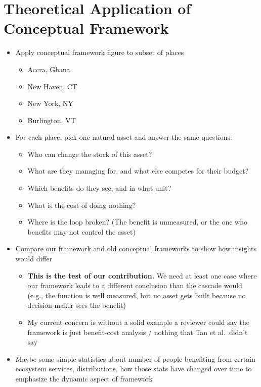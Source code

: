\documentclass[12pt]{article}
\begin{document}
\section{Theoretical Application of Conceptual Framework}\label{sec:app}
\begin{itemize}
  \item Apply conceptual framework figure to subset of places 
  \begin{itemize}
    \item Accra, Ghana
    \item New Haven, CT
    \item New York, NY
    \item Burlington, VT
  \end{itemize}
  \item For each place, pick one natural asset and answer the same questions:
  \begin{itemize}
    \item Who can change the stock of this asset?
    \item What are they managing for, and what else competes for their budget?
    \item Which benefits do they see, and in what unit?
    \item What is the cost of doing nothing?
    \item Where is the loop broken? (The benefit is unmeasured, or the one who benefits may not control the asset)
  \end{itemize}
  \item Compare our framework and old conceptual frameworks to show how insights would differ 
  \begin{itemize}
    \item \textbf{This is the test of our contribution.} We need at least one case where our framework leads to a different conclusion than the cascade would (e.g., the function is well measured, but no asset gets built because no decision-maker sees the benefit)
    \item My current concern is without a solid example a reviewer could say the framework is just benefit-cost analysis / nothing that Tan et al.\ didn't say
  \end{itemize}
  \item Maybe some simple statistics about number of people benefiting from certain ecosystem services, distributions, how those stats have changed over time to emphasize the dynamic aspect of framework 
\end{itemize}
\end{document}

